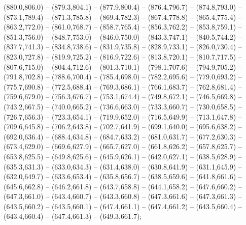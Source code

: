  (880.0,806.0) -- (879.3,804.1) -- (877.9,800.4) -- (876.4,796.7) -- (874.8,793.0) -- (873.1,789.4) -- (871.3,785.8) -- (869.4,782.3) -- (867.4,778.8) -- (865.4,775.4) -- (863.2,772.0) -- (861.0,768.7) -- (858.7,765.4) -- (856.3,762.2) -- (853.8,759.1) -- (851.3,756.0) -- (848.7,753.0) -- (846.0,750.0) -- (843.3,747.1) -- (840.5,744.2) -- (837.7,741.3) -- (834.8,738.6) -- (831.9,735.8) -- (828.9,733.1) -- (826.0,730.4) -- (823.0,727.8) -- (819.9,725.2) -- (816.9,722.6) -- (813.8,720.1) -- (810.7,717.5) -- (807.6,715.0) -- (804.4,712.6) -- (801.3,710.1) -- (798.1,707.6) -- (794.9,705.2) -- (791.8,702.8) -- (788.6,700.4) -- (785.4,698.0) -- (782.2,695.6) -- (779.0,693.2) -- (775.7,690.8) -- (772.5,688.4) -- (769.3,686.1) -- (766.1,683.7) -- (762.8,681.4) -- (759.6,679.0) -- (756.3,676.7) -- (753.1,674.4) -- (749.8,672.1) -- (746.5,669.8) -- (743.2,667.5) -- (740.0,665.2) -- (736.6,663.0) -- (733.3,660.7) -- (730.0,658.5) -- (726.7,656.3) -- (723.3,654.1) -- (719.9,652.0) -- (716.5,649.9) -- (713.1,647.8) -- (709.6,645.8) -- (706.2,643.8) -- (702.7,641.9) -- (699.1,640.0) -- (695.6,638.2) -- (692.0,636.4) -- (688.4,634.8) -- (684.7,633.2) -- (681.0,631.7) -- (677.2,630.3) -- (673.4,629.0) -- (669.6,627.9) -- (665.7,627.0) -- (661.8,626.2) -- (657.8,625.7) -- (653.8,625.5) -- (649.8,625.6) -- (645.9,626.1) -- (642.0,627.1) -- (638.5,628.9) -- (635.3,631.3) -- (633.0,634.3) -- (631.4,638.0) -- (630.8,641.9) -- (631.1,645.9) -- (632.0,649.7) -- (633.6,653.4) -- (635.8,656.7) -- (638.5,659.6) -- (641.8,661.6) -- (645.6,662.8) -- (646.2,661.8) -- (643.7,658.8) -- (644.1,658.2) -- (647.6,660.2) -- (647.3,661.0) -- (643.4,660.7) -- (643.3,660.8) -- (647.3,661.6) -- (647.3,661.3) -- (643.5,660.2) -- (643.5,660.1) -- (647.4,661.1) -- (647.4,661.2) -- (643.5,660.4) -- (643.4,660.4) -- (647.4,661.3) -- (649.3,661.7);
